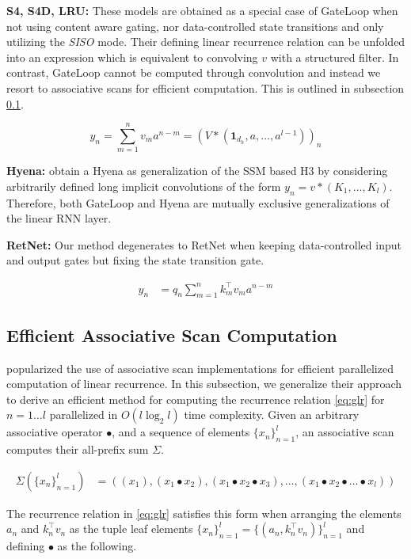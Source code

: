 \textbf{S4, S4D, LRU:} These models are obtained as a special case of GateLoop when not using content aware gating, nor data-controlled state transitions and only utilizing the \textit{SISO} mode. Their defining linear recurrence relation can be unfolded into an expression which  is equivalent to convolving $v$ with a structured filter. In contrast, GateLoop cannot be computed through convolution and instead we resort to associative scans for efficient computation. This is outlined in subsection \ref{sec:scan}.

\begin{equation} \label{eq:s4}
y_n = \sum_{m=1}^{n} v_m a^{n-m} = (V * (\mathbf{1}_{d_h}, a, \dots, a^{l-1}))_n
\end{equation}

\textbf{Hyena:} \cite{poli2023hyena} obtain a Hyena as generalization of the SSM based H3 by considering arbitrarily defined long implicit convolutions of the form $y_n = v * (K_1, \dots, K_l)$. Therefore, both GateLoop and Hyena are mutually exclusive generalizations of the linear RNN layer. 

\textbf{RetNet:} Our method degenerates to RetNet when keeping data-controlled input and output gates but fixing the state transition gate.

\begin{align} \label{eq:retnet}
y_n &= q_n \sum_{m=1}^{n} k_m^\top v_m a^{n-m} 
\end{align}

\subsection{Efficient Associative Scan Computation}\label{sec:scan}
\cite{smith2023simplified} popularized the use of associative scan implementations for efficient parallelized computation of linear recurrence. In this subsection, we generalize their approach to derive an efficient method for computing the recurrence relation \ref{eq:glr} for $n = 1 \dots l$ parallelized in $O(l \log_2 l)$ time complexity. Given an arbitrary associative operator $\bullet$, and a sequence of elements $\{ x_n \}_{n=1}^{l}$, an associative scan computes their all-prefix sum $\Sigma$.

\begin{align}
\Sigma(\{ x_n \}_{n=1}^{l}) &= ((x_1), (x_1 \bullet x_2), (x_1 \bullet x_2 \bullet x_3), \ldots, (x_1 \bullet x_2 \bullet \ldots \bullet x_l))
\end{align}

The recurrence relation in \ref{eq:glr} satisfies this form when arranging the elements $a_n$ and $k_n^\top v_n$ as the tuple leaf elements $\{ x_n \}_{n=1}^{l} = \{(a_n, k_n^\top v_n)\}_{n=1}^{l}$ and defining $\bullet$ as the following.

